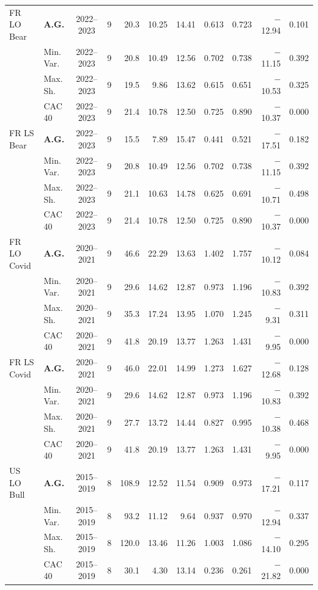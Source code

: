 \begin{longtable}{p{2.6cm} l c c r r r r r r r}
FR LO Bear & \textbf{A.G.} & 2022--2023 & 9 & 20.3 & 10.25 & 14.41 & 0.613 & 0.723 & $-$12.94 & 0.101 \\
 & Min.\,Var. & 2022--2023 & 9 & 20.8 & 10.49 & 12.56 & 0.702 & 0.738 & $-$11.15 & 0.392 \\
 & Max.\,Sh. & 2022--2023 & 9 & 19.5 & 9.86 & 13.62 & 0.615 & 0.651 & $-$10.53 & 0.325 \\
 & CAC 40 & 2022--2023 & 9 & 21.4 & 10.78 & 12.50 & 0.725 & 0.890 & $-$10.37 & 0.000 \\
\midrule
FR LS Bear & \textbf{A.G.} & 2022--2023 & 9 & 15.5 & 7.89 & 15.47 & 0.441 & 0.521 & $-$17.51 & 0.182 \\
 & Min.\,Var. & 2022--2023 & 9 & 20.8 & 10.49 & 12.56 & 0.702 & 0.738 & $-$11.15 & 0.392 \\
 & Max.\,Sh. & 2022--2023 & 9 & 21.1 & 10.63 & 14.78 & 0.625 & 0.691 & $-$10.71 & 0.498 \\
 & CAC 40 & 2022--2023 & 9 & 21.4 & 10.78 & 12.50 & 0.725 & 0.890 & $-$10.37 & 0.000 \\
\midrule
FR LO Covid & \textbf{A.G.} & 2020--2021 & 9 & 46.6 & 22.29 & 13.63 & 1.402 & 1.757 & $-$10.12 & 0.084 \\
 & Min.\,Var. & 2020--2021 & 9 & 29.6 & 14.62 & 12.87 & 0.973 & 1.196 & $-$10.83 & 0.392 \\
 & Max.\,Sh. & 2020--2021 & 9 & 35.3 & 17.24 & 13.95 & 1.070 & 1.245 & $-$9.31 & 0.311 \\
 & CAC 40 & 2020--2021 & 9 & 41.8 & 20.19 & 13.77 & 1.263 & 1.431 & $-$9.95 & 0.000 \\
\midrule
FR LS Covid & \textbf{A.G.} & 2020--2021 & 9 & 46.0 & 22.01 & 14.99 & 1.273 & 1.627 & $-$12.68 & 0.128 \\
 & Min.\,Var. & 2020--2021 & 9 & 29.6 & 14.62 & 12.87 & 0.973 & 1.196 & $-$10.83 & 0.392 \\
 & Max.\,Sh. & 2020--2021 & 9 & 27.7 & 13.72 & 14.44 & 0.827 & 0.995 & $-$10.38 & 0.468 \\
 & CAC 40 & 2020--2021 & 9 & 41.8 & 20.19 & 13.77 & 1.263 & 1.431 & $-$9.95 & 0.000 \\
\midrule
US LO Bull & \textbf{A.G.} & 2015--2019 & 8 & 108.9 & 12.52 & 11.54 & 0.909 & 0.973 & $-$17.21 & 0.117 \\
 & Min.\,Var. & 2015--2019 & 8 & 93.2 & 11.12 & 9.64 & 0.937 & 0.970 & $-$12.94 & 0.337 \\
 & Max.\,Sh. & 2015--2019 & 8 & 120.0 & 13.46 & 11.26 & 1.003 & 1.086 & $-$14.10 & 0.295 \\
 & CAC 40 & 2015--2019 & 8 & 30.1 & 4.30 & 13.14 & 0.236 & 0.261 & $-$21.82 & 0.000 \\

\end{longtable}

